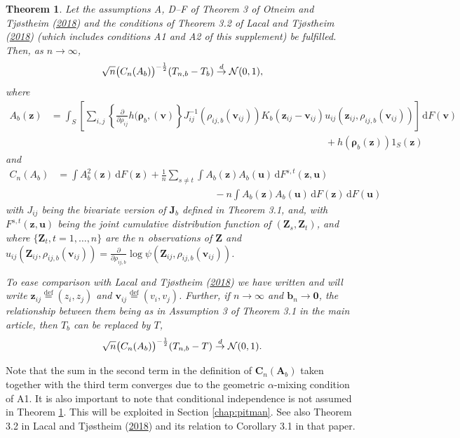 \documentclass[
  12pt,
  letterpaper]{article}
\newtheorem{thm}{Theorem}[section]
\numberwithin{equation}{section}
\newcommand{\Z}{\bm{Z}}
\newcommand{\z}{\bm{z}}
\newcommand{\fv}{\bm{v}}
\newcommand{\fu}{\bm{u}}
\newcommand{\fC}{\bm{C}}
\newcommand{\fA}{\bm{A}}
\newcommand{\J}{\bm{J}}
\newcommand{\frho}{\bm{\rho}}
\newcommand{\bb}{\bm{b}}
\newcommand{\di}{\,\textrm{d}}
\begin{document}
\begin{thm} 
Let the assumptions A, D--F of Theorem 3 of Otneim and Tjøstheim (\protect\hyperlink{ref-otneim2017conditional}{2018}) and the conditions of Theorem 3.2 of Lacal and Tjøstheim (\protect\hyperlink{ref-lacal2018estimating}{2018}) (which includes conditions A1 and A2 of this supplement) be fulfilled. Then,
as $n \to \infty$,
$$
\sqrt{n}\big(C_{n}(A_b)\big)^{-\frac{1}{2}}(T_{n,b} - T_b) \buildrel {d} \over {\to} {\cal N}(0,1),
$$
where
\begin{align*}
A_b(\z)  & = \int_{S} \left[\sum_{i,j}\left\{\frac{\partial}{\partial \rho_{ij}} h(\frho_b,(\fv)\right\}J_{ij}^{-1}(\rho_{ij,b}(\fv_{ij}))K_b(\z_{ij}- \fv_{ij})u_{ij}(\z_{ij},\rho_{ij,b}(\fv_{ij}))\right] \di F(\fv) \\
& \qquad\qquad\qquad\qquad\qquad\qquad\qquad\qquad\qquad\qquad\qquad\qquad\qquad\qquad + h(\frho_b(\z))1_S(\z)
\end{align*}
and 
\begin{align}
C_n(A_b) &= \int A_b^2(\z) \di F(\z) + \frac{1}{n}\sum_{s \neq t}\int A_b(\z)A_b(\fu) \di F^{s,t}(\z,\fu) \nonumber \\
& \qquad\qquad\qquad\qquad\qquad\qquad\qquad\qquad - n\int A_b(\z)A_b(\fu) \di F(\z) \di F(\fu)
\label{eq:t0}
\end{align}
with $J_{ij}$ being the bivariate version of $\J_b$ defined in Theorem 3.1, and, with $F^{s,t}(\z,\fu)$ being the joint cumulative distribution function of $(\Z_s,\Z_t)$, and where $\{\Z_{t}, t=1,\ldots,n\}$ are the $n$ observations of $\Z$ and $u_{ij}(\Z_{ij}, \rho_{ij,b}(\fv_{ij})) = \frac{\partial}{\partial \rho_{ij,b}}\log\psi(\Z_{ij},\rho_{ij,b}(\fv_{ij}))$. 

To ease comparison with Lacal and Tjøstheim (\protect\hyperlink{ref-lacal2018estimating}{2018}) we have written and will write $\z_{ij} \stackrel{\textrm{def}}{=} (z_i,z_j)$ and $\fv_{ij} \stackrel{\textrm{def}}{=} (v_i,v_j)$. Further, if $n \to \infty$ and $\bb_n \to \bm{0}$, the relationship between them being as in Assumption 3 of Theorem 3.1 in the main article, then $T_b$ can be replaced by $T$,
$$
\sqrt{n}\big(C_{n}(A_b)\big)^{-\frac{1}{2}}(T_{n,b} - T) \buildrel {d} \over {\to} {\cal N}(0,1).
$$
\label{thm:F2}
\end{thm}

Note that the sum in the second term in the definition of \(\fC_n(\fA_b)\) taken together with the third term converges due to the geometric \(\alpha\)-mixing condition of A1. It is also important to note that conditional independence is not assumed in Theorem \ref{thm:F2}. This will be exploited in Section \ref{chap:pitman}. See also Theorem 3.2 in Lacal and Tjøstheim (\protect\hyperlink{ref-lacal2018estimating}{2018}) and its relation to Corollary 3.1 in that paper.
\end{document}
